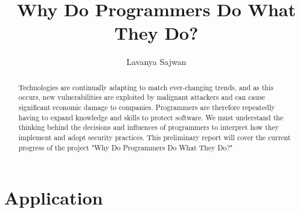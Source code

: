 \documentclass[11pt
              , a4paper
              , twoside
              , openright
              ]{report}
\title{Why Do Programmers Do What They Do?}
\author{Lavanya Sajwan}
\date{}
\begin{document}
\frontmatter



\begin{abstract}

Technologies are continually adapting to match ever-changing trends, and as this occurs, new vulnerabilities are exploited by malignant attackers and can cause significant economic damage to companies. Programmers are therefore repeatedly having to expand knowledge and skills to protect software. We must understand the thinking behind the decisions and influences of programmers to interpret how they implement and adopt security practices. This preliminary report will cover the current progress of the project "Why Do Programmers Do What They Do?"

\end{abstract}


\maketitle



\tableofcontents



\mainmatter









\backmatter



%



\appendix
\chapter{Application}

\end{document}

